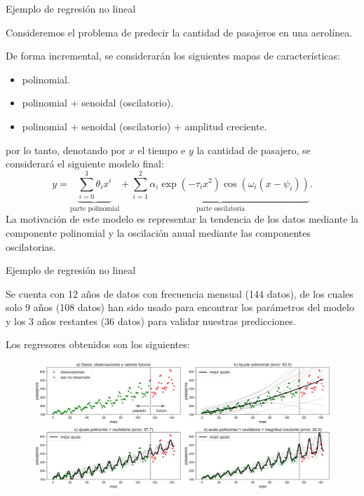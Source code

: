 \documentclass[9pt]{beamer}
\begin{document}
\begin{frame}{Ejemplo de regresión no lineal}

Consideremos el problema de predecir la cantidad de pasajeros en una aerolínea.\\ \pause

De forma incremental, se considerarán los siguientes mapas de características:

\begin{itemize}
	\item polinomial.
	\item polinomial + senoidal (oscilatorio).
	\item polinomial + senoidal (oscilatorio) + amplitud creciente.
\end{itemize}
\pause
por lo tanto, denotando por $x$ el tiempo e $y$ la cantidad de pasajero, se considerará el siguiente modelo final:
\begin{equation*}
    y = \underbrace{\sum_{i=0}^3 \theta_i x^i}_\text{parte polinomial} + \underbrace{ \sum_{i=1}^2 \alpha_i\exp(-\tau_ix^2)\cos(\omega_i(x-\psi_i))}_\text{parte oscilatoria}.
\end{equation*} \pause
La motivación de este modelo es representar la tendencia de los datos mediante la componente polinomial y la oscilación anual mediante las componentes oscilatorias.\\

	
\end{frame}

\begin{frame}{Ejemplo de regresión no lineal}

Se cuenta con 12 años de datos con frecuencia mensual (144 datos), de los cuales solo 9 años (108 datos) han sido usado para encontrar los parámetros del modelo y los  3 años restantes (36 datos) para validar nuestras predicciones. \pause

Los regresores obtenidos son los siguientes:


\begin{figure}[H]
    \centering
    \includegraphics[width=1\textwidth, frame]{../img/cap2_pasajeros.pdf}
\end{figure}


\end{frame}
\end{document}
